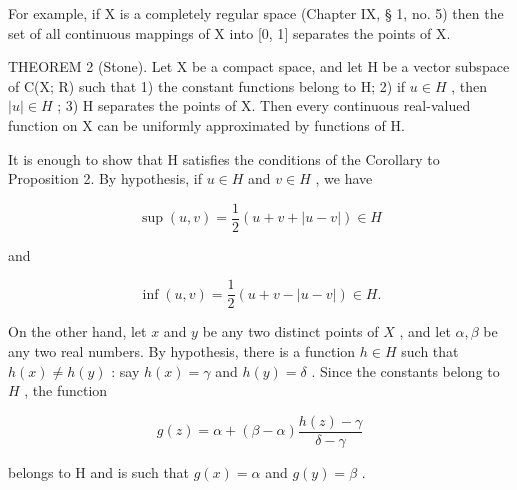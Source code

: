 For example, if X is a completely regular space (Chapter IX, § 1, no. 5) then the set of all continuous mappings of X into {[}0, 1{]} separates the points of X.

THEOREM 2 (Stone). Let X be a compact space, and let H be a vector subspace of C(X; R) such that 1) the constant functions belong to H; 2) if \(u \in H\) , then \(|u| \in H\) ; 3) H separates the points of X. Then every continuous real-valued function on X can be uniformly approximated by functions of H.

It is enough to show that H satisfies the conditions of the Corollary to Proposition 2. By hypothesis, if \(u \in H\) and \(v \in H\) , we have

\[
\sup (u, v) = \frac {1}{2} (u + v + | u - v |) \in H
\]

and

\[
\inf (u, v) = \frac {1}{2} (u + v - | u - v |) \in H.
\]

On the other hand, let \(x\) and \(y\) be any two distinct points of \(X\) , and let \(\alpha, \beta\) be any two real numbers. By hypothesis, there is a function \(h \in H\) such that \(h(x) \neq h(y)\) : say \(h(x) = \gamma\) and \(h(y) = \delta\) . Since the constants belong to \(H\) , the function

\[
g (z) = \alpha + (\beta - \alpha) \frac {h (z) - \gamma}{\delta - \gamma}
\]

belongs to H and is such that \(g(x) = \alpha\) and \(g(y) = \beta\) .

